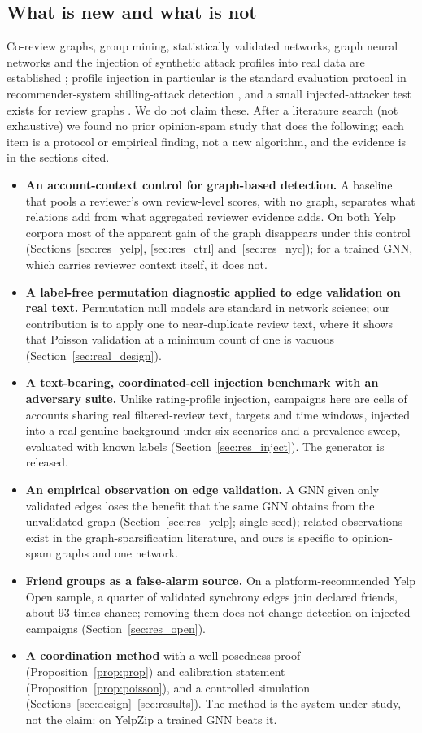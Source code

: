 \documentclass[pdflatex,sn-basic]{sn-jnl}
\theoremstyle{thmstyleone}
\theoremstyle{thmstylethree}
\begin{document}
\subsection*{What is new and what is not}
Co-review graphs, group mining, statistically validated networks, graph neural networks and the injection of synthetic attack profiles into real data are established \citep{wang2011,akoglu2013,mukherjee2012,tumminello2011,dhawan2019,dou2020}; profile injection in particular is the standard evaluation protocol in recommender-system shilling-attack detection \citep[e.g.][]{liu2019kalman}, and a small injected-attacker test exists for review graphs \citep{bidgoly2020}. We do not claim these. After a literature search (not exhaustive) we found no prior opinion-spam study that does the following; each item is a protocol or empirical finding, not a new algorithm, and the evidence is in the sections cited.
\begin{itemize}
\item \textbf{An account-context control for graph-based detection.} A baseline that pools a reviewer's own review-level scores, with no graph, separates what relations add from what aggregated reviewer evidence adds. On both Yelp corpora most of the apparent gain of the graph disappears under this control (Sections~\ref{sec:res_yelp}, \ref{sec:res_ctrl} and~\ref{sec:res_nyc}); for a trained GNN, which carries reviewer context itself, it does not.
\item \textbf{A label-free permutation diagnostic applied to edge validation on real text.} Permutation null models are standard in network science; our contribution is to apply one to near-duplicate review text, where it shows that Poisson validation at a minimum count of one is vacuous (Section~\ref{sec:real_design}).
\item \textbf{A text-bearing, coordinated-cell injection benchmark with an adversary suite.} Unlike rating-profile injection, campaigns here are cells of accounts sharing real filtered-review text, targets and time windows, injected into a real genuine background under six scenarios and a prevalence sweep, evaluated with known labels (Section~\ref{sec:res_inject}). The generator is released.
\item \textbf{An empirical observation on edge validation.} A GNN given only validated edges loses the benefit that the same GNN obtains from the unvalidated graph (Section~\ref{sec:res_yelp}; single seed); related observations exist in the graph-sparsification literature, and ours is specific to opinion-spam graphs and one network.
\item \textbf{Friend groups as a false-alarm source.} On a platform-recommended Yelp Open sample, a quarter of validated synchrony edges join declared friends, about 93 times chance; removing them does not change detection on injected campaigns (Section~\ref{sec:res_open}).
\item \textbf{A coordination method} with a well-posedness proof (Proposition~\ref{prop:prop}) and calibration statement (Proposition~\ref{prop:poisson}), and a controlled simulation (Sections~\ref{sec:design}--\ref{sec:results}). The method is the system under study, not the claim: on YelpZip a trained GNN beats it.
\end{itemize}
\end{document}
